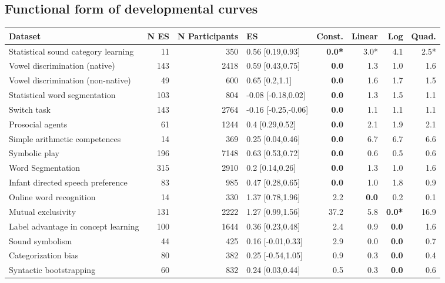 \documentclass[10pt, letterpaper]{article}
\begin{document}
\hypertarget{functional-form-of-developmental-curves}{%
\subsection{Functional form of developmental
curves}\label{functional-form-of-developmental-curves}}

\begin{table}[ht]
\begin{tabular}{l|r|r|l|r|r|r|r}
\hline
\textbf{Dataset} & N ES & N Participants & ES & Const. & Linear & Log & Quad.\\
\hline
Statistical sound category learning  & 11 & 350 & 0.56 [0.19,0.93] & \textbf{0.0*} & 3.0* & 4.1 & 2.5*\\
Vowel discrimination (native) & 143 & 2418 & 0.59 [0.43,0.75] & \textbf{0.0} & 1.3 & 1.0 & 1.6\\
Vowel discrimination (non-native) & 49 & 600 & 0.65 [0.2,1.1] & \textbf{0.0} & 1.6 & 1.7 & 1.5\\
Statistical word segmentation & 103 & 804 & -0.08 [-0.18,0.02] & \textbf{0.0} & 1.3 & 1.5 & 1.1\\
Switch task & 143 & 2764 & -0.16 [-0.25,-0.06] & \textbf{0.0} & 1.1 & 1.1 & 1.1\\
Prosocial agents & 61 & 1244 & 0.4 [0.29,0.52] & \textbf{0.0} & 2.1 & 1.9 & 2.1\\
Simple arithmetic competences & 14 & 369 & 0.25 [0.04,0.46] & \textbf{0.0} & 6.7 & 6.7 & 6.6\\
Symbolic play & 196 & 7148 & 0.63 [0.53,0.72] & \textbf{0.0} & 0.6 & 0.5 & 0.6\\
Word Segmentation  & 315 & 2910 & 0.2 [0.14,0.26] & \textbf{0.0} & 1.3 & 1.0 & 1.6\\
Infant directed speech preference & 83 & 985 & 0.47 [0.28,0.65] & \textbf{0.0} & 1.0 & 1.8 & 0.9\\
Online word recognition & 14 & 330 & 1.37 [0.78,1.96] & 2.2 & \textbf{0.0} & 0.2 & 0.1\\
Mutual exclusivity & 131 & 2222 & 1.27 [0.99,1.56] & 37.2 & 5.8 & \textbf{0.0*} & 16.9\\
Label advantage in concept learning & 100 & 1644 & 0.36 [0.23,0.48] & 2.4 & 0.9 & \textbf{0.0} & 1.6\\
Sound symbolism & 44 & 425 & 0.16 [-0.01,0.33] & 2.9 & 0.0 & \textbf{0.0} & 0.7\\
Categorization bias & 80 & 382 & 0.25 [-0.54,1.05] & 0.9 & 0.3 & \textbf{0.0} & 0.4\\
Syntactic bootstrapping & 60 & 832 & 0.24 [0.03,0.44] & 0.5 & 0.3 & \textbf{0.0} & 0.6\\

\end{tabular}
\end{table}
\end{document}
